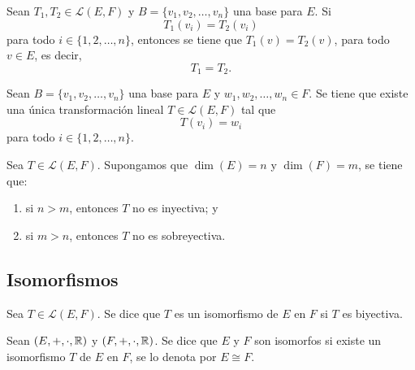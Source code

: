 \documentclass[a4,11pt]{aleph-notas}
\begin{document}
\begin{teo}
    Sean $T_1,T_2 \in \mathcal{L}(E,F)$ y $B= \{v_1, v_2, \ldots, v_n\}$ una base para $E$. Si
    \[
        T_1(v_i) = T_2(v_i)
    \]
    para todo $i \in \{1, 2, \ldots, n\}$, entonces se tiene que $T_1(v)=T_2(v)$, para todo $v\in E$, es decir, 
    \[
        T_1 = T_2.
    \]
\end{teo}

\begin{teo}
    Sean $B= \{v_1, v_2, \ldots, v_n\}$ una base para $E$ y $w_1, w_2, \ldots, w_n\in F$. Se tiene que existe una única transformación lineal $T \in \mathcal{L}(E,F)$ tal que
    \[
        T(v_i) = w_i
    \]
    para todo $i\in \{1, 2, \ldots, n\}$.
\end{teo}


\begin{teo}
    Sea $T \in \mathcal{L}(E,F)$. Supongamos que $\dim(E) = n$ y $\dim(F) = m$, se tiene que:
    \begin{enumerate}
        \item si $n > m$, entonces $T$ no es inyectiva; y
        \item si $m > n$, entonces $T$ no es sobreyectiva.
    \end{enumerate}
\end{teo} 

\subsection{Isomorfismos}


\begin{defi}[Isomorfismo]
    Sea $T \in \mathcal{L}(E,F)$. Se dice que $T$ es un isomorfismo de $E$ en $F$ si $T$ es biyectiva.
\end{defi}

\begin{defi}
    Sean $(E,+,\cdot,\mathbb{R})$ y $(F,+,\cdot,\mathbb{R})$. Se dice que $E$ y $F$ son isomorfos si existe un isomorfismo $T$ de $E$ en $F$, se lo denota por $E \cong F$.
\end{defi}
\end{document}

